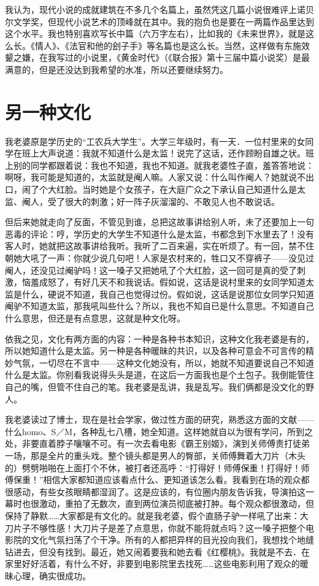 我认为，现代小说的成就建筑在不多几个名篇上，虽然凭这几篇小说很难评上诺贝尔文学奖，但现代小说艺术的顶峰就在其中。我的抱负也是要在一两篇作品里达到这个水平。我也特别喜欢写长中篇（六万字左右），比如我的《未来世界》，就是这么长。《情人》、《法官和他的刽子手》等名篇也是这么长。当然，这样做有东施效颦之嫌，在我写过的小说里，《黄金时代》（《联合报》第十三届中篇小说奖）是最满意的，但是还没达到我希望的水准，所以还要继续努力。
 
\chapter{另一种文化}

我老婆原是学历史的“工农兵大学生”。大学三年级时，有一天．一位村里来的女同学在班上大声说道：我就不知道什么是太监！说完了这话，还作顾盼自雄之状。班上别的同学都跟着说：我也不知道，我也不知道。就我老婆性子直，羞答答地说：啊呀，我可能是知道的，太监就是阉人嘛。人家又说：什么叫作阉人？她就说不出口，闹了个大红脸。当时她是个女孩子，在大庭广众之下承认自己知道什么是太监、阉人，受了很大的刺激；好一阵子灰溜溜的、不敢见人也不敢说话。 

但后来她就走向了反面，不管见到谁，总把这故事讲给别人听，未了还要加上一句恶毒的评论：哼，学历史的大学生不知道什么是太监，书都念到下水里去了！没有客人时，她就把这故事讲给我听。我听了二百来遍，实在听烦了。有一回，禁不住朝她大吼了一声：你就少说几句吧！人家是农村来的，牲口又不穿裤子——没见过阉人，还没见过阉驴吗！这一嗓子又把她吼了个大红脸，这一回可是真的受了刺激，恼羞成怒了，有好几天不和我说话。假如说，这话是说村里来的女同学知道太监是什么，硬说不知道，我自己也觉得过份。假如说，这话是说那位女同学只知道阉驴不知道太监，那我吼叫些什么？所以，我也不知自已是什么意思。不知道自己什么意思，但还是有点意思，这就是种文化呀。 

依我之见，文化有两方面的内容：一种是各种书本知识，这种文化我老婆是有的，所以她知道什么是太监。另一种是各种暖昧的共识，以及各种可意会不可言传的精妙气氛，一切尽在不言中——这种文化她没有，所以，她就不知道要说自己不知道什么是太监。你别看我说得头头是道，在这后一方面我也是个土包子。我倒能管住自己的嘴，但管不住自己的笔。我老婆是乱讲，我是乱写。我们俩都是没文化的野人。 

我老婆读过了博士，现在是社会学家，做过性方面的研究，熟悉这方面的文献——什么homo、S／M，各种乱七八槽，她全知道。这样她就自以为很有学问，所到之处，非要直着脖子嚷嚷不可。有一次去看电影《霸王别姬》，演到关师傅责打徒弟一场，那是全片的重头戏。整个镜头都是男人的臀部，关师傅舞着大刀片（木头的）劈劈啪啪在上面打个不休，被打者还高呼：“打得好！师傅保重！打得好！师傅保重！”相信大家都知道应该看点什么、更知道该怎么看。我看到在场的观众都很感动，有些女孩眼睛都湿润了。这是应该的，有位圈内朋友告诉我，导演拍这一幕时也很激动，重拍了无数次，直到两位演员彻底被打肿。每个观众都很激动，但保持了静默……大家都是有文化的。就是我老婆，假个直肠子驴一样吼了出来：大刀片子不够性感！大刀片子是差了点意思，你就不能将就点吗？这一嗓子把整个电影院的文化气氛扫荡了个干净。所有的人都把异样的目光投向我们，我想找个地缝钻进去，但没有找到。最近，她又闹着要我和她去看《红樱桃》。我就是不去．在家里好好活着，有什么不好，非要到电影院里去找死……这些电影利用了观众的暖昧心理，确实很成功。 

